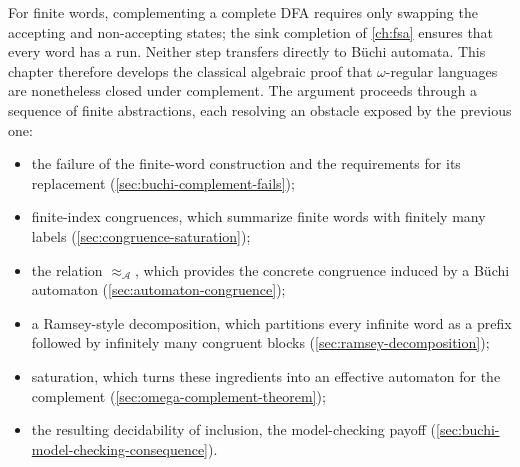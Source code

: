 For finite words, complementing a complete DFA requires only swapping
the accepting and non-accepting states; the sink completion of
\cref{ch:fsa} ensures that every word has a run.  Neither step transfers
directly to B\"uchi automata.  This chapter therefore develops the
classical algebraic proof that $\omega$-regular languages are nonetheless
closed under complement.  The argument proceeds through a sequence of
finite abstractions, each resolving an obstacle exposed by the previous
one:
\begin{itemize}[nosep]
  \item the failure of the finite-word construction and the requirements
        for its replacement
        (\cref{sec:buchi-complement-fails});
  \item finite-index congruences, which summarize finite words with
        finitely many labels (\cref{sec:congruence-saturation});
  \item the relation $\approx_{\mathcal A}$, which provides the concrete congruence
        induced by a B\"uchi automaton
        (\cref{sec:automaton-congruence});
  \item a Ramsey-style decomposition, which partitions every infinite
        word as a prefix followed by infinitely many congruent blocks
        (\cref{sec:ramsey-decomposition});
  \item saturation, which turns these ingredients into
        an effective automaton for the complement
        (\cref{sec:omega-complement-theorem});
  \item the resulting decidability of inclusion, the model-checking
        payoff (\cref{sec:buchi-model-checking-consequence}).
\end{itemize}

